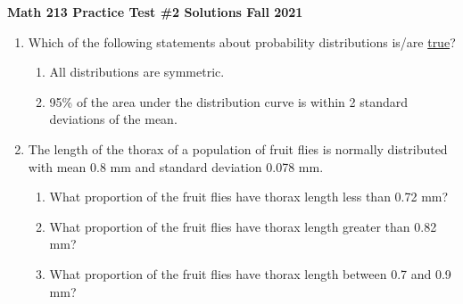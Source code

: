 \documentclass[12pt,fullpage]{amsart}
\begin{document}
\textbf{Math 213 \quad\ddag\quad Practice Test \#2 Solutions \quad\ddag\quad Fall 2021}

\hrulefill
\medskip
\begin{enumerate}
\item Which of the following statements about probability distributions is/are \underline{true}?
  \begin{enumerate}
  \item All distributions are symmetric.
  \item 95\% of the area under the distribution curve is within 2 standard deviations of the mean.
  \end{enumerate}

\vfill
  
\item The length of the thorax of a population of fruit flies is
  normally distributed with mean 0.8 mm and standard deviation 0.078
  mm.
  \begin{enumerate}
  \item What proportion of the fruit flies have thorax length less
    than 0.72 mm?
    
  
  \item What proportion of the fruit flies have thorax length greater
    than 0.82 mm?

    
  \item What proportion of the fruit flies have thorax length between
    0.7 and 0.9 mm?

\end{enumerate}
\end{enumerate}
\end{document}
